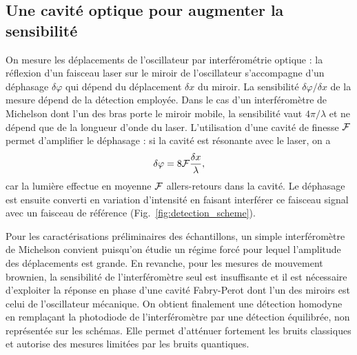 \documentclass[12pt,a4paper]{article}
\begin{document}
\subsection{Une cavité optique pour augmenter la sensibilité}
\label{sec:cavity}

On mesure les déplacements de l'oscillateur par interférométrie optique : la réflexion d'un faisceau laser sur le miroir de l'oscillateur s'accompagne d'un déphasage $\delta\varphi$ qui dépend du déplacement $\delta x$ du miroir.
La sensibilité $\delta\varphi / \delta x$ de la mesure dépend de la détection employée.
Dans le cas d'un interféromètre de Michelson dont l'un des bras porte le miroir mobile, la sensibilité vaut $4\pi/\lambda$ et ne dépend que de la longueur d'onde du laser.
L'utilisation d'une cavité de finesse $\cal{F}$ permet d'amplifier le déphasage : si la cavité est résonante avec le laser, on a
\begin{equation}
\delta \varphi = 8{\cal{F}}\frac{\delta x}{\lambda},
\end{equation}
car la lumière effectue en moyenne ${\cal{F}}$ allers-retours dans la cavité.
Le déphasage est ensuite converti en variation d'intensité en faisant interférer ce faisceau signal avec un faisceau de référence (Fig.~\ref{fig:detection_scheme}).

Pour les caractérisations préliminaires des échantillons, un simple interféromètre de Michelson convient puisqu'on étudie un régime forcé pour lequel l'amplitude des déplacements est grande.
En revanche, pour les mesures de mouvement brownien, la sensibilité de l'interféromètre seul est insuffisante et il est nécessaire d'exploiter la réponse en phase d'une cavité Fabry-Perot dont l'un des miroirs est celui de l'oscillateur mécanique.
On obtient finalement une détection homodyne en remplaçant la photodiode de l'interféromètre par une détection équilibrée, non représentée sur les schémas.
Elle permet d'atténuer fortement les bruits classiques et autorise des mesures limitées par les bruits quantiques. 
\end{document}
